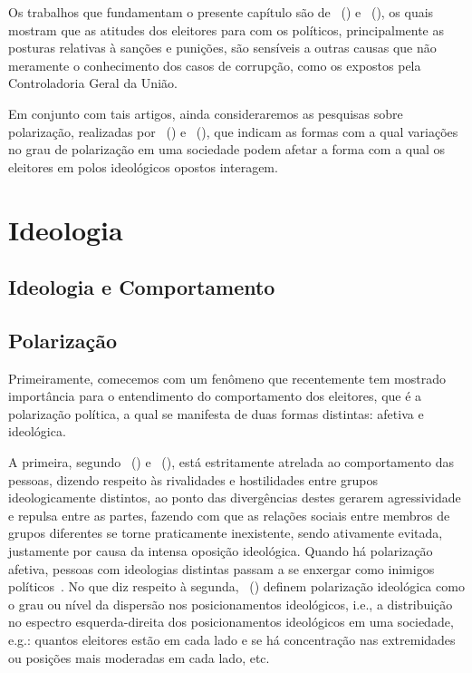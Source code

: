 \documentclass[
	12pt,				%
	openright,			%
	twoside,			%
	a4paper,			%
	openany,
	english,			%
	brazil				%
	]{abntex2}
\begin{document}
Os trabalhos que fundamentam o presente capítulo são de ~(\citeyear{Boas2019Apr}) e ~(\citeyear{Botero2021Apr}), os quais mostram que as atitudes dos eleitores para com os políticos, principalmente as posturas relativas à sanções e punições, são sensíveis a outras causas que não meramente o conhecimento dos casos de corrupção, como os expostos pela Controladoria Geral da União.

Em conjunto com tais artigos, ainda consideraremos as pesquisas sobre polarização, realizadas por ~(\citeyear{fuks2020afeto}) e ~(\citeyear{Bednar2021Dec}), que indicam as formas com a qual variações no grau de polarização em uma sociedade podem afetar a forma com a qual os eleitores em polos ideológicos opostos interagem.

\section{Ideologia}

\subsection{Ideologia e Comportamento}

\subsection{Polarização}


Primeiramente, comecemos com um fenômeno que recentemente tem mostrado importância para o entendimento do comportamento dos eleitores, que é a polarização política, a qual se manifesta de duas formas distintas: afetiva e ideológica\cite{Bednar2021Dec, Baldassarri2021Dec, Axelrod2021Dec}.

A primeira, segundo ~(\citeyear{Bednar2021Dec}) e ~(\citeyear{Baldassarri2021Dec}), está estritamente atrelada ao comportamento das pessoas, dizendo respeito às rivalidades e hostilidades entre grupos ideologicamente distintos, ao ponto das divergências destes gerarem agressividade e repulsa entre as partes, fazendo com que as relações sociais entre membros de grupos diferentes se torne praticamente inexistente, sendo ativamente evitada, justamente por causa da intensa oposição ideológica. Quando há polarização afetiva, pessoas com ideologias distintas passam a se enxergar como inimigos políticos~\cite{Bednar2021Dec}. No que diz respeito à segunda, ~(\citeyear{Axelrod2021Dec}) definem polarização ideológica como o grau ou nível da dispersão nos posicionamentos ideológicos, i.e., a distribuição no espectro esquerda-direita dos posicionamentos ideológicos em uma sociedade, e.g.: quantos eleitores estão em cada lado e se há concentração nas extremidades ou posições mais moderadas em cada lado, etc.
\end{document}
